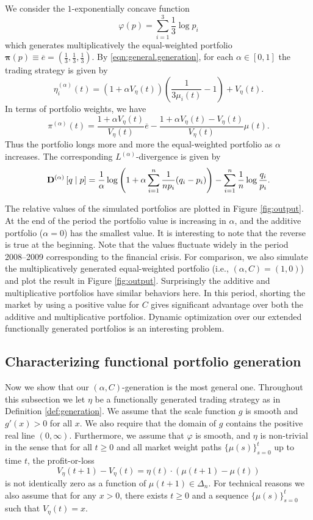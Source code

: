 \documentclass[graybox]{svmult}
\begin{document}
We consider the $1$-exponentially concave function
\begin{equation}
\varphi(p) = \sum_{i = 1}^3 \frac{1}{3} \log p_i
\end{equation}
which generates multiplicatively the equal-weighted portfolio $\boldsymbol{\pi}(p) \equiv \overline{e} = \left(\frac{1}{3}, \frac{1}{3}, \frac{1}{3}\right)$. By \eqref{eqn:general.generation}, for each $\alpha \in [0, 1]$ the trading strategy is given by
\[
\eta^{(\alpha)}_i(t) = \left(1 + \alpha V_{\eta}(t)\right) \left(\frac{1}{3 \mu_i(t)} - 1\right) + V_{\eta}(t).
\]
In terms of portfolio weights, we have
\[
\pi^{(\alpha)}(t) = \frac{1 + \alpha V_{\eta}(t)}{V_{\eta}(t)} \overline{e} - \frac{1 + \alpha V_{\eta}(t) - V_{\eta}(t)}{V_{\eta}(t)} \mu(t).
\]
Thus the portfolio longs more and more the equal-weighted portfolio as $\alpha$ increases. The corresponding $L^{(\alpha)}$-divergence is given by
\[
{\bf D}^{(\alpha)}\left[q \mid p\right] = \frac{1}{\alpha} \log \left(1 + \alpha \sum_{i = 1}^n \frac{1}{n p_i} (q_i - p_i)\right) - \sum_{i = 1}^n \frac{1}{n} \log \frac{q_i}{p_i}.
\]

The relative values of the simulated portfolios are plotted in Figure \ref{fig:output}. At the end of the period the portfolio value is increasing in $\alpha$, and the additive portfolio ($\alpha = 0$) has the smallest value. It is interesting to note that the reverse is true at the beginning. Note that the values fluctuate widely in the period 2008--2009 corresponding to the financial crisis. For comparison, we also simulate the multiplicatively generated equal-weighted portfolio (i.e., $(\alpha, C) = (1, 0)$) and plot the result in  Figure \ref{fig:output}. Surprisingly the additive and multiplicative portfolios have similar behaviors here. In this period, shorting the market by using a positive value for $C$ gives significant advantage over both the additive and multiplicative portfolios. Dynamic optimization over our extended functionally generated portfolios is an interesting problem.


\subsection{Characterizing functional portfolio generation} \label{sec:characterize}
Now we show that our $(\alpha, C)$-generation is the most general one. Throughout this subsection we let $\eta$ be a functionally generated trading strategy as in Definition \ref{def:generation}. We assume that the scale function $g$ is smooth and $g'(x) > 0$ for all $x$. We also require that the domain of $g$ contains the positive real line $(0, \infty)$. Furthermore, we assume that $\varphi$ is smooth, and $\eta$ is non-trivial in the sense that for all $t \geq 0$ and all market weight paths $\{\mu(s)\}_{s = 0}^t$ up to time $t$, the profit-or-loss
\[
V_{\eta}(t + 1) - V_{\eta}(t) = \eta(t) \cdot (\mu(t + 1) - \mu(t))
\]
is not identically zero as a function of $\mu(t + 1) \in \Delta_n$. For technical reasons we also assume that for any $x > 0$, there exists $t \geq 0$ and a sequence $\{\mu(s)\}_{s = 0}^t$ such that $V_{\eta}(t) = x$.
\end{document}
